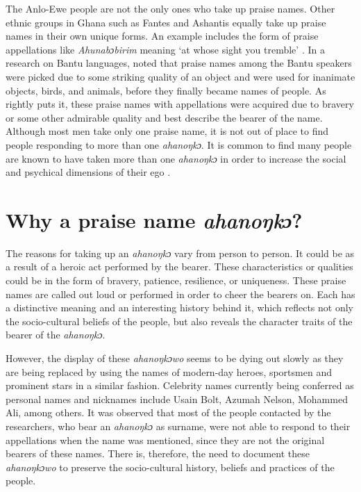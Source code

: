 \documentclass[output=paper]{langscibook}
\begin{document}
The Anlo-Ewe people are not the only ones who take up praise names. Other ethnic groups in Ghana such as Fantes and Ashantis equally take up praise names in their own unique forms. An example includes the form of praise appellations like \textit{Ahunabɔbirim} meaning `at whose sight you tremble' \citep{obeng2001african}. In a research on Bantu languages, \citet{finnegan2012oral} noted that praise names among the Bantu speakers were picked due to some striking quality of an object and were used for inanimate objects, birds, and animals, before they finally became names of people. As \citet{adjah2011name} rightly puts it, these praise names with appellations were acquired due to bravery or some other admirable quality and best describe the bearer of the name. Although most men take only one praise name, it is not out of place to find people responding to more than one {\textit{ahanoŋkɔ}}. It is common to find many people are known to have taken more than one {\textit{ahanoŋkɔ}} in order to increase the social and psychical dimensions of their ego \citep{avorgbedor1983psycho}.

\section{Why a praise name \textit{ahanoŋkɔ}?}

The reasons for taking up an {\textit{ahanoŋkɔ}} vary from person to person. It could be as a result of a heroic act performed by the bearer. These characteristics or qualities could be in the form of bravery, patience, resilience, or uniqueness. These praise names are called out loud or performed in order to cheer the bearers on. Each has a distinctive meaning and an interesting history behind it, which reflects not only the socio-cultural beliefs of the people, but also reveals the character traits of the bearer of the {\textit{ahanoŋkɔ}}.
 
However, the display of these {\textit{ahanoŋkɔwo}} seems to be dying out slowly as they are being replaced by using the names of modern-day heroes, sportsmen and prominent stars in a similar fashion. Celebrity names currently being conferred as personal names and nicknames include Usain Bolt, Azumah Nelson, Mohammed Ali, among others. It was observed that most of the people contacted by the researchers, who bear an {\textit{ahanoŋkɔ}} as surname, were not able to respond to their appellations when the name was mentioned, since they are not the original bearers of these names. There is, therefore, the need to document these {\textit{ahanoŋkɔwo}} to preserve the socio-cultural history, beliefs and practices of the people.
\end{document}
